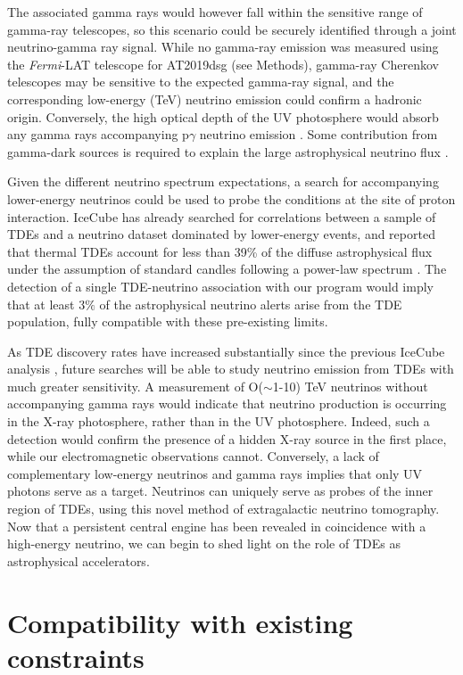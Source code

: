 The associated gamma rays would however fall within the sensitive range of gamma-ray telescopes, so this scenario could be securely identified through a joint neutrino-gamma ray signal. While no gamma-ray emission was measured using the \textit{Fermi}-LAT telescope for AT2019dsg (see Methods), gamma-ray Cherenkov telescopes may be sensitive to the expected gamma-ray signal, and the corresponding low-energy (TeV) neutrino emission could confirm a hadronic origin. Conversely, the high optical depth of the UV photosphere would absorb any gamma rays accompanying p$\gamma$ neutrino emission . Some contribution from gamma-dark sources is required to explain the large astrophysical neutrino flux .

Given the different neutrino spectrum expectations, a search for accompanying lower-energy neutrinos could be used to probe the conditions at the site of proton interaction. IceCube has already searched for correlations between a sample of TDEs and a neutrino dataset dominated by lower-energy events, and reported that thermal TDEs account for less than 39\% of the diffuse astrophysical flux under the assumption of standard candles following a power-law spectrum . The detection of a single TDE-neutrino association with our program would imply that at least $3\%$ of the astrophysical neutrino alerts arise from the TDE population, fully compatible with these pre-existing limits. 

As TDE discovery rates have increased substantially since the previous IceCube analysis , future searches will be able to study neutrino emission from TDEs with much greater sensitivity. A measurement of O($\sim$1-10) TeV neutrinos without accompanying gamma rays would indicate that neutrino production is occurring in the X-ray photosphere, rather than in the UV photosphere. Indeed, such a detection would confirm the presence of a hidden X-ray source in the first place, while our electromagnetic observations cannot. Conversely, a lack of complementary low-energy neutrinos and gamma rays implies that only UV photons serve as a target. Neutrinos can uniquely serve as probes of the inner region of TDEs, using this novel method of extragalactic neutrino tomography. Now that a persistent central engine has been revealed in coincidence with a high-energy neutrino, we can begin to shed light on the role of TDEs as astrophysical accelerators.

\section{Compatibility with existing constraints}
\label{sec:diffuse}

